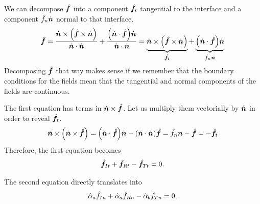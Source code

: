 We can decompose $\hat{\bm{f}}$ into a component $\hat{\bm{f}}_t$ tangential to the interface and a component $\hat{f}_n \dot{\bm{n}}$ normal to that interface.
\begin{equation}
    \vectcp{f}
    =
    \frac{
        \vectu{n} \times \left(\vectcp{f} \times \vectu{n}\right)
    }{
        \vectu{n}\cdot\vectu{n}
    }
    +
    \frac{
        \left(\vectu{n} \cdot \vectcp{f}\right)\vectu{n}
    }{
        \vectu{n}\cdot\vectu{n}
    }
    =
    \underbrace{
        \vectu{n} \times \left(\vectcp{f} \times \vectu{n}\right)
    }_{\vectcp{f}_t}
    +
    \underbrace{
        \left(\vectu{n} \cdot \vectcp{f}\right)\vectu{n}
    }_{\cp{f}_n \vectu{n}}
\end{equation}
Decomposing $\hat{\bm{f}}$ that way makes sense if we remember that the boundary conditions for the fields mean that the tangential and normal components of the fields are continuous.

The first equation has terms in $\dot{\bm{n}} \times \hat{\bm{f}}$.
Let us multiply them vectorially by $\dot{\bm{n}}$ in order to reveal $\hat{\bm{f}}_t$.
\begin{equation}
    \vectu{n} \times \left( \vectu{n} \times \vectcp{f} \right)
    =
    \left( \vectu{n} \cdot \vectcp{f} \right) \vectu{n}
    -
    \left( \vectu{n} \cdot \vectu{n} \right) \vectcp{f}
    =
    \cp{f}_n \vect{n} - \vectcp{f}
    = -\vectcp{f}_t
\end{equation}
Therefore, the first equation becomes
\begin{equation}
    \hat{\bm{f}}_{I t} + \hat{\bm{f}}_{R t} - \hat{\bm{f}}_{T t} = 0
    \text{.}
    \label{eq:boundaries_sum_ft_0}
\end{equation}

The second equation directly translates into
\begin{equation}
    \hat{\alpha}_a \hat{f}_{I n}
    +
    \hat{\alpha}_a \hat{f}_{R n}
    -
    \hat{\alpha}_b \hat{f}_{T n}
    =
    0 
    \text{.}
    \label{eq:boundaries_sum_fn_0}
\end{equation}

